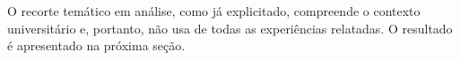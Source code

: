 \documentclass{textolivre}
\begin{document}

O recorte temático em análise, como já explicitado, compreende o contexto universitário e, portanto, não usa de todas as experiências relatadas. O resultado é apresentado na próxima seção.
\end{document}
